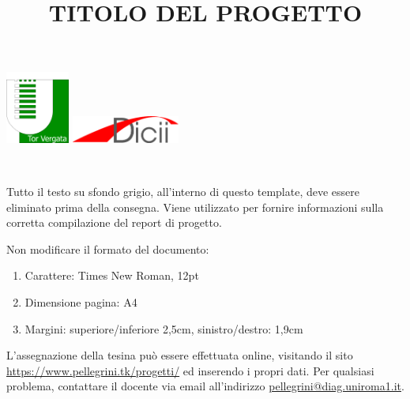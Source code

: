 \documentclass[12pt]{article}
\title{TITOLO DEL PROGETTO}
\begin{document}
\includegraphics[width=2.1cm, valign=t]{image1}
\hfill
\includegraphics[width=3.55cm, valign=t]{image2}
{\let\newpage\relax\maketitle}
\tableofcontents
\
\begin{templateblock}
    Tutto il testo su sfondo grigio, all’interno di questo template,
    deve essere eliminato prima della consegna.
    Viene utilizzato per fornire informazioni sulla corretta compilazione
    del report di progetto.

    Non modificare il formato del documento:
    \begin{enumerate}
        \item Carattere: Times New Roman, 12pt
        \item Dimensione pagina: A4
        \item Margini: superiore/inferiore 2,5cm, sinistro/destro: 1,9cm
    \end{enumerate}

    L’assegnazione della tesina può essere effettuata online, visitando il
    sito \href{https://www.pellegrini.tk/progetti/}
    {https://www.pellegrini.tk/progetti/} ed inserendo i propri dati.
    Per qualsiasi problema, contattare il docente via email all’indirizzo
    \url{pellegrini@diag.uniroma1.it}.
\end{templateblock}





\appendix

\end{document}
